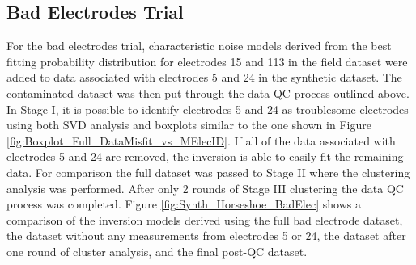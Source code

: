 \documentclass[final,authoryear,5p,times,twocolumn]{elsarticle}
\begin{document}
\subsection{Bad Electrodes Trial}

For the bad electrodes trial, characteristic noise models derived from the best fitting probability distribution for electrodes 15 and 113 in the field dataset were added to data associated with electrodes 5 and 24 in the synthetic dataset. The contaminated dataset was then put through the data QC process outlined above. In Stage I, it is possible to identify electrodes 5 and 24 as troublesome electrodes using both SVD analysis and boxplots similar to the one shown in Figure \ref{fig:Boxplot_Full_DataMisfit_vs_MElecID}. If all of the data associated with electrodes 5 and 24 are removed, the inversion is able to easily fit the remaining data. For comparison the full dataset was passed to Stage II where the clustering analysis was performed. After only 2 rounds of Stage III clustering the data QC process was completed. Figure \ref{fig:Synth_Horseshoe_BadElec} shows a comparison of the inversion models derived using the full bad electrode dataset, the dataset without any measurements from electrodes 5 or 24, the dataset after one round of cluster analysis, and the final post-QC dataset.
\end{document}
